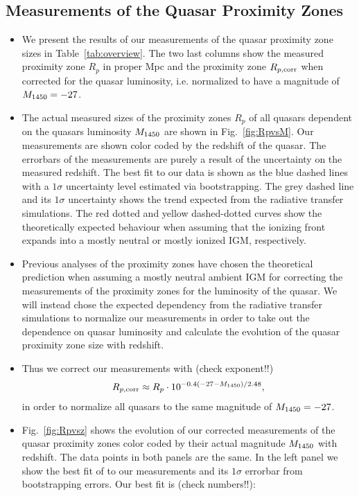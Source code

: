 \documentclass[iop]{emulateapj}
\newcommand{\hii} {\ion{H}{2}\xspace}
\begin{document}
\subsection{Measurements of the Quasar Proximity Zones}

\begin{itemize}
\item We present the results of our measurements of the quasar proximity zone sizes in Table~\ref{tab:overview}. The two last columns show the measured proximity zone $R_p$ in proper Mpc and the proximity zone $R_{p, \rm corr}$ when corrected for the quasar luminosity, i.e. normalized to have a magnitude of $M_{\rm 1450}=-27$.  
\item The actual measured sizes of the proximity zones $R_p$ of all quasars dependent on the quasars luminosity $M_{\rm 1450}$ are shown in Fig.~\ref{fig:RpvsM}. Our measurements are shown color coded by the redshift of the quasar. The errorbars of the measurements are purely a result of the uncertainty on the measured redshift. The best fit to our data is shown as the blue dashed lines with a $1\sigma$ uncertainty level estimated via bootstrapping. The grey dashed line and its $1\sigma$ uncertainty shows the trend expected from the radiative transfer simulations. The red dotted and yellow dashed-dotted curves show the theoretically expected behaviour when assuming that the ionizing \hii front expands into a mostly neutral or mostly ionized IGM, respectively. 
\item Previous analyses of the proximity zones have chosen the theoretical prediction when assuming a mostly neutral ambient IGM for correcting the measurements of the proximity zones for the luminosity of the quasar. We will instead chose the expected dependency from the radiative transfer simulations to normalize our measurements in order to take out the dependence on quasar luminosity and calculate the evolution of the quasar proximity zone size with redshift. 
\item Thus we correct our measurements with (check exponent!!)
\begin{align}
R_{p, \rm corr} \approx R_p\cdot 10^{-0.4(-27-M_{\rm 1450})/2.48}, \label{eq:correction} 
\end{align}
in order to normalize all quasars to the same magnitude of $M_{\rm 1450}=-27$. 
\item Fig.~\ref{fig:Rpvsz} shows the evolution of our corrected measurements of the quasar proximity zones color coded by their actual magnitude $M_{\rm 1450}$ with redshift. The data points in both panels are the same. In the left panel we show the best fit of to our measurements and its $1\sigma$ errorbar from bootstrapping errors. Our best fit is (check numbers!!):

\end{itemize}
\end{document}
